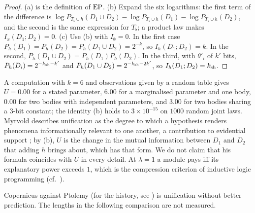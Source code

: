 \begin{proof}
(a) is the definition of $\mathrm{EP}$. (b) Expand the six logarithms: the first term of the difference is $\log P_{T_\flat\cup h}(D_1\cup D_2)-\log P_{T_\flat\cup h}(D_1)-\log P_{T_\flat\cup h}(D_2)$, and the second is the same expression for $T_\flat$; a product law makes $I_x(D_1;D_2)=0$. (c) Use (b) with $I_\emptyset=0$. In the first case $P_h(D_1)=P_h(D_2)=P_h(D_1\cup D_2)=2^{-k}$, so $I_h(D_1;D_2)=k$. In the second, $P_h(D_1\cup D_2)=P_h(D_1)P_h(D_2)$. In the third, with $\theta'_i$ of $k'$ bits, $P_h(D_i)=2^{-k_{\rm sh}-k'}$ and $P_h(D_1\cup D_2)=2^{-k_{\rm sh}-2k'}$, so $I_h(D_1;D_2)=k_{\rm sh}$.
\end{proof}

A computation with $k=6$ and observations given by a random table gives $U=0.00$ for a stated parameter, $6.00$ for a marginalised parameter and one body, $0.00$ for two bodies with independent parameters, and $3.00$ for two bodies sharing a $3$-bit constant; the identity (b) holds to $3\times10^{-15}$ on $1000$ random joint laws. Myrvold describes unification as the degree to which a hypothesis renders phenomena informationally relevant to one another, a contribution to evidential support \citep{myrvold2003bayesian}; by (b), $U$ is the change in the mutual information between $D_1$ and $D_2$ that adding $h$ brings about, which has that form. We do not claim that his formula coincides with $U$ in every detail. At $\lambda=1$ a module pays iff its explanatory power exceeds $1$, which is the compression criterion of inductive logic programming (cf.\ \citealp{muggleton1995inverse,srinivasan1994justification}).

Copernicus against Ptolemy (for the history, see \citealp{kuhn1957copernican}) is unification without better prediction. The lengths in the following comparison are not measured.

